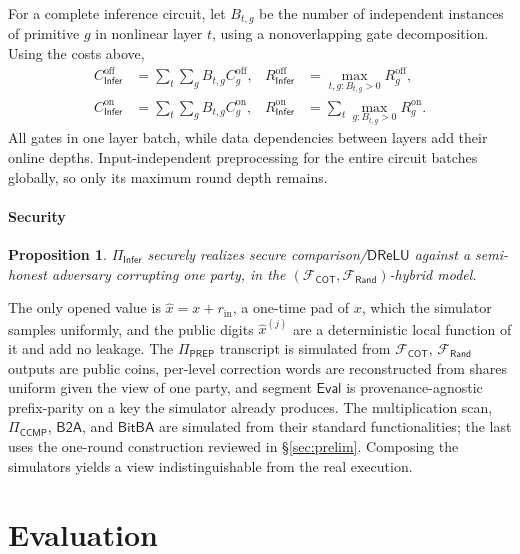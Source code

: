 \documentclass[journal]{IEEEtran}
\newtheorem{proposition}{Proposition}
\theoremstyle{definition}
\theoremstyle{plain}
\newcommand{\Eval}{\mathsf{Eval}}
\newcommand{\Fcot}{\mathcal{F}_{\mathsf{COT}}}
\newcommand{\Frand}{\mathcal{F}_{\mathsf{Rand}}}
\newcommand{\DReLU}{\mathsf{DReLU}}
\newcommand{\BitBA}{\mathsf{BitBA}}
\newcommand{\xhat}{\hat{x}}
\newcommand{\PREP}{\Pi_{\mathsf{PREP}}}
\newcommand{\CCMP}{\Pi_{\mathsf{CCMP}}}
\newcommand{\seg}[1]{^{\scriptscriptstyle(#1)}}   %
\begin{document}
For a complete inference circuit, let $B_{t,g}$ be the number of independent
instances of primitive $g$ in nonlinear layer $t$, using a nonoverlapping gate
decomposition. Using the costs above,
\begin{equation}
\begin{aligned}
C^{\mathrm{off}}_{\mathsf{Infer}}
 &=\sum_t\sum_g B_{t,g}C^{\mathrm{off}}_g,&
R^{\mathrm{off}}_{\mathsf{Infer}}
 &=\max_{t,g:B_{t,g}>0}R^{\mathrm{off}}_g,\\
C^{\mathrm{on}}_{\mathsf{Infer}}
 &=\sum_t\sum_g B_{t,g}C^{\mathrm{on}}_g,&
R^{\mathrm{on}}_{\mathsf{Infer}}
 &=\sum_t\max_{g:B_{t,g}>0}R^{\mathrm{on}}_g.
\end{aligned}
\label{eq:infer-cost}
\end{equation}
All gates in one layer batch, while data dependencies between layers add their
online depths. Input-independent preprocessing for the entire circuit batches
globally, so only its maximum round depth remains.

\paragraph*{Security}
\begin{proposition}
$\Pi_{\mathsf{Infer}}$ securely realizes secure comparison/$\DReLU$ against a semi-honest adversary corrupting one party, in the $(\Fcot,\Frand)$-hybrid
model.
\end{proposition}
\begin{IEEEproof}
The only opened value is $\xhat=x+r_{\mathrm{in}}$, a one-time pad of $x$, which the simulator samples uniformly, and the public digits $\xhat\seg{j}$ are a
deterministic local function of it and add no leakage. The $\PREP$ transcript is
simulated from $\Fcot$, $\Frand$ outputs are public coins, per-level correction
words are reconstructed from shares uniform given the view of one party, and segment
$\Eval$ is provenance-agnostic prefix-parity on a key the simulator already produces.
The multiplication scan, $\CCMP$, $\mathsf{B2A}$, and $\BitBA$ are simulated
from their standard functionalities; the last uses the one-round construction
reviewed in \S\ref{sec:prelim}. Composing the simulators yields a view indistinguishable from
the real execution.
\end{IEEEproof}

\section{Evaluation}\label{sec:eval}
\end{document}
